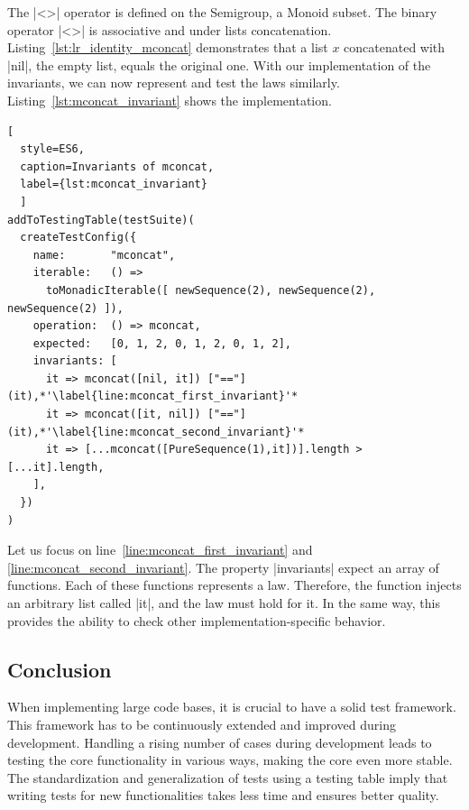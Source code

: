 The |<>| operator is defined on the Semigroup, a Monoid subset. The binary 
operator |<>| is associative and under lists concatenation. Listing~\ref{lst:lr_identity_mconcat} 
demonstrates that a list $x$ concatenated with |nil|, the empty list, equals the original 
one. With our implementation of the invariants, we can now represent and 
test the laws similarly. Listing~\ref{lst:mconcat_invariant} shows the
implementation.

\begin{lstlisting}[
  style=ES6, 
  caption=Invariants of mconcat,
  label={lst:mconcat_invariant}
  ]
addToTestingTable(testSuite)(
  createTestConfig({
    name:       "mconcat",
    iterable:   () => 
      toMonadicIterable([ newSequence(2), newSequence(2), newSequence(2) ]),
    operation:  () => mconcat,
    expected:   [0, 1, 2, 0, 1, 2, 0, 1, 2],
    invariants: [
      it => mconcat([nil, it]) ["=="] (it),*'\label{line:mconcat_first_invariant}'*
      it => mconcat([it, nil]) ["=="] (it),*'\label{line:mconcat_second_invariant}'*
      it => [...mconcat([PureSequence(1),it])].length > [...it].length,
    ],
  })
)
\end{lstlisting}

Let us focus on line~\ref{line:mconcat_first_invariant} and 
\ref{line:mconcat_second_invariant}.
The property |invariants| expect an array of functions. Each of these
functions represents a law. Therefore, the function injects an arbitrary list
called |it|, and the law must hold for it. In the same way, this provides the
ability to check other implementation-specific behavior.

\subsection{Conclusion}
\label{sub:Conclusion}
When implementing large code bases, it is crucial to have a solid test
framework. This framework has to be continuously extended and improved during
development.
Handling a rising number of cases during development leads to testing the core
functionality in various ways, making the core even more stable.
\newline
The standardization and generalization of tests using a testing table imply that
writing tests for new functionalities takes less time and ensures better
quality.
